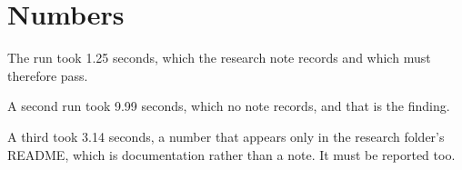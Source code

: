 \section{Numbers}
\label{sec:ch01-numbers}

The run took 1.25 seconds, which the research note records and which must
therefore pass.

A second run took 9.99 seconds, which no note records, and that is the finding.

A third took 3.14 seconds, a number that appears only in the research folder's
README, which is documentation rather than a note. It must be reported too.
